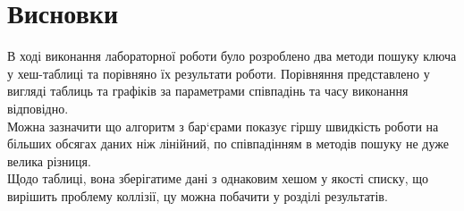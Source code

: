 \clearpage
\section{Висновки}
В ході виконання лабораторної роботи було розроблено два методи пошуку ключа у хеш-таблиці та порівняно їх результати роботи. Порівняння представлено у вигляді таблиць та графіків за параметрами співпадінь та часу виконання відповідно. \\

Можна зазначити що алгоритм з бар`єрами показує гіршу швидкість роботи на більших обсягах даних ніж лінійний, по співпадінням в методів пошуку не дуже велика різниця.\\

Щодо таблиці, вона зберігатиме дані з однаковим хешом у якості списку, що вирішить проблему коллізії, цу можна побачити у розділі результатів.



